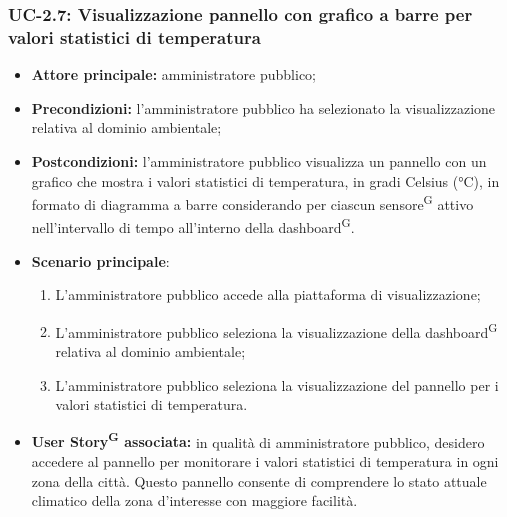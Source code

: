 \documentclass[8pt]{article}
\newcommand{\glossterm}[1]{#1\textsuperscript{G}} %
\begin{document}
\subsubsection*{UC-2.7: Visualizzazione pannello con grafico a barre per valori statistici di temperatura}
\begin{itemize}
    \item \textbf{Attore principale:} amministratore pubblico;
    \item \textbf{Precondizioni:} l'amministratore pubblico ha selezionato la visualizzazione
        relativa al dominio ambientale;
    \item \textbf{Postcondizioni:} l'amministratore pubblico visualizza un pannello con un grafico che mostra i valori statistici di temperatura, in gradi Celsius (°C), in formato di diagramma a barre considerando per ciascun \glossterm{sensore} attivo nell'intervallo di tempo all'interno della \glossterm{dashboard}.
    \item \textbf{Scenario principale}:
    \begin{enumerate}
    \item L'amministratore pubblico accede alla piattaforma di visualizzazione;
    \item L'amministratore pubblico seleziona la visualizzazione della \glossterm{dashboard} relativa al dominio
        ambientale; 
    \item L'amministratore pubblico seleziona la visualizzazione del pannello per i valori statistici di temperatura.
    \end{enumerate}
\item \textbf{\glossterm{User Story} associata:} in qualità di amministratore pubblico, desidero accedere al pannello per monitorare i valori statistici di temperatura in ogni zona della città. Questo pannello consente di comprendere lo stato attuale climatico della zona d'interesse con maggiore facilità.
\end{itemize}
\end{document}
